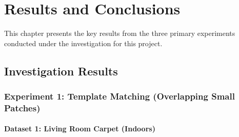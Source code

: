 \chapter{Results and Conclusions}

%
%
%

This chapter presents the key results from the three primary experiments conducted under the investigation for this project. 

\clearpage
\section{Investigation Results}

\subsection{Experiment 1: Template Matching (Overlapping Small Patches)}

\subsubsection{Dataset 1: Living Room Carpet (Indoors)}

